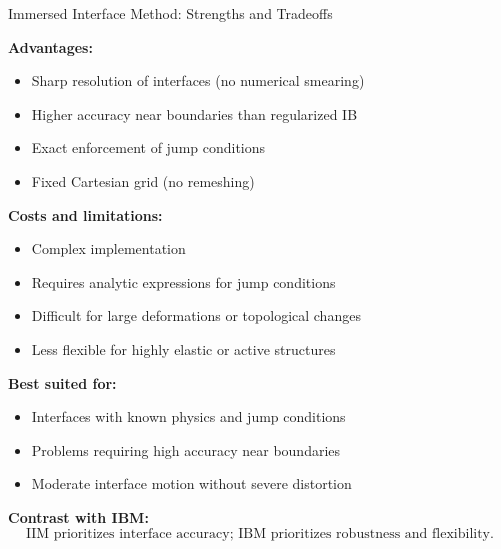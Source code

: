 \documentclass{beamer}
\begin{document}
\begin{frame}{Immersed Interface Method: Strengths and Tradeoffs}
\footnotesize

\textbf{Advantages:}
\begin{itemize}
    \item Sharp resolution of interfaces (no numerical smearing)
    \item Higher accuracy near boundaries than regularized IB
    \item Exact enforcement of jump conditions
    \item Fixed Cartesian grid (no remeshing)
\end{itemize}

\medskip
\textbf{Costs and limitations:}
\begin{itemize}
    \item Complex implementation
    \item Requires analytic expressions for jump conditions
    \item Difficult for large deformations or topological changes
    \item Less flexible for highly elastic or active structures
\end{itemize}

\medskip
\textbf{Best suited for:}
\begin{itemize}
    \item Interfaces with known physics and jump conditions
    \item Problems requiring high accuracy near boundaries
    \item Moderate interface motion without severe distortion
\end{itemize}

\medskip
\textbf{Contrast with IBM:}
\[
\text{IIM prioritizes interface accuracy; IBM prioritizes robustness and flexibility.}
\]

\end{frame}
\end{document}
